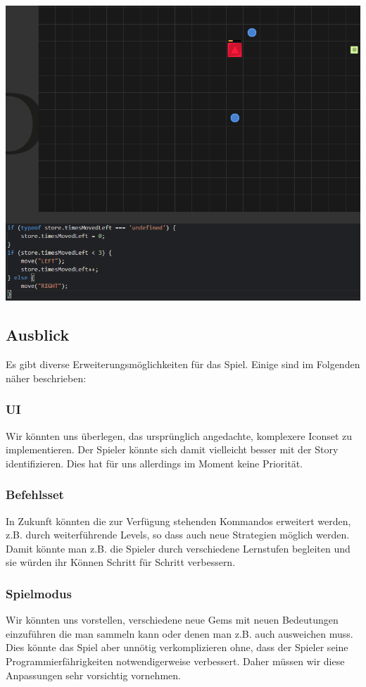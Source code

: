 \documentclass[11pt,a4paper,titlepage]{article}
\begin{document}
\includegraphics[width=\textwidth]{game2.png}

\subsection{Ausblick}

Es gibt diverse Erweiterungsmöglichkeiten für das Spiel. Einige sind im Folgenden näher beschrieben:

\subsubsection{UI}
Wir könnten uns überlegen, das ursprünglich angedachte, komplexere Iconset zu implementieren. Der Spieler könnte sich damit vielleicht besser mit der Story identifizieren. Dies hat für uns allerdings im Moment keine Priorität.

\subsubsection{Befehlsset}
In Zukunft könnten die zur Verfügung stehenden Kommandos erweitert werden, z.B. durch weiterführende Levels, so dass auch neue Strategien möglich werden. Damit könnte man z.B. die Spieler durch verschiedene Lernstufen begleiten und sie würden ihr Können Schritt für Schritt verbessern.

\subsubsection{Spielmodus}
Wir könnten uns vorstellen, verschiedene neue Gems mit neuen Bedeutungen einzuführen die man sammeln kann oder denen man z.B. auch ausweichen muss. Dies könnte das Spiel aber unnötig verkomplizieren ohne, dass der Spieler seine Programmierfährigkeiten notwendigerweise verbessert. Daher müssen wir diese Anpassungen sehr vorsichtig vornehmen.
\end{document}
